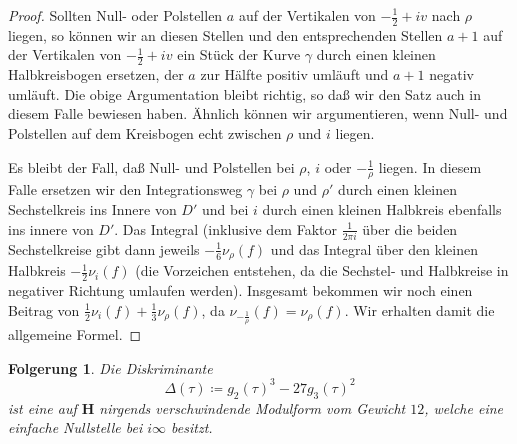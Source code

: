 \documentclass[a4paper,twoside,openright]{report}
\newtheorem{cor}[thm]{Folgerung}
\theoremstyle{definition}
\theoremstyle{remark}
\begin{document}
\begin{proof}
  Sollten Null- oder Polstellen $a$ auf der Vertikalen von $-\frac 1 2 + iv$
  nach $\rho$ liegen, so können wir an diesen Stellen und den entsprechenden
  Stellen $a + 1$ auf der Vertikalen von $-\frac 1 2 + iv$ ein Stück der Kurve $\gamma$ durch
  einen kleinen Halbkreisbogen ersetzen, der $a$ zur Hälfte positiv umläuft und
  $a + 1$ negativ umläuft. Die obige Argumentation bleibt richtig, so daß wir den
  Satz auch in diesem Falle bewiesen haben. Ähnlich können wir argumentieren, wenn
  Null- und Polstellen auf dem Kreisbogen echt zwischen $\rho$ und $i$ liegen.
  
  Es bleibt der Fall, daß Null- und Polstellen bei $\rho$, $i$ oder $-\frac 1\rho$
  liegen. In diesem Falle ersetzen wir den Integrationsweg $\gamma$ bei
  $\rho$ und $\rho'$ durch einen kleinen Sechstelkreis ins Innere von $D'$ und bei $i$ durch
  einen kleinen Halbkreis ebenfalls ins innere von $D'$. Das Integral (inklusive
  dem Faktor $\frac 1{2\pi i}$ über die
  beiden Sechstelkreise gibt dann jeweils $- \frac 1 6 \nu_\rho(f)$ und das
  Integral über den kleinen Halbkreis $-\frac 1 2 \nu_i(f)$ (die Vorzeichen entstehen,
  da die Sechstel- und Halbkreise in negativer Richtung umlaufen werden). Insgesamt
  bekommen wir noch einen Beitrag von $\frac 1 2 \nu_i(f) + \frac 1 3 \nu_\rho(f)$,
  da $\nu_{-\frac 1 \rho} (f) = \nu_\rho(f)$. Wir erhalten damit die allgemeine
  Formel.
\end{proof}

\begin{cor}
  Die \emph{Diskriminante}
  \[
    \Delta(\tau) \coloneqq g_2(\tau)^3 - 27 g_3(\tau)^2
  \]
  ist eine auf $\mathbf H$ nirgends verschwindende Modulform vom Gewicht $12$,
  welche eine einfache Nullstelle bei $i\infty$ besitzt.  
\end{cor}
\end{document}

